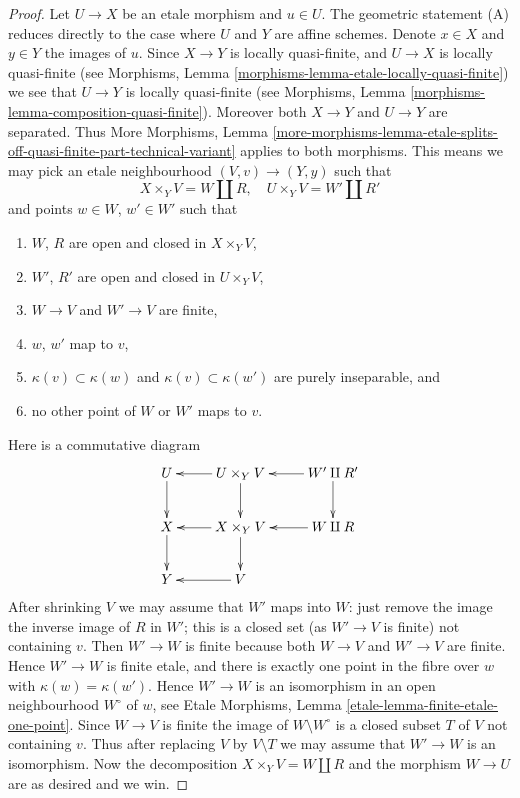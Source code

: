 \begin{proof}
Let $U \to X$ be an etale morphism and $u \in U$.
The geometric statement (A) reduces directly to the case where $U$ and $Y$
are affine schemes. Denote $x \in X$ and $y \in Y$ the
images of $u$. Since $X \to Y$ is locally quasi-finite, and $U \to X$ is
locally quasi-finite (see
Morphisms, Lemma \ref{morphisms-lemma-etale-locally-quasi-finite})
we see that $U \to Y$ is locally quasi-finite (see
Morphisms, Lemma \ref{morphisms-lemma-composition-quasi-finite}).
Moreover both $X \to Y$ and $U \to Y$ are separated. Thus
More Morphisms, Lemma
\ref{more-morphisms-lemma-etale-splits-off-quasi-finite-part-technical-variant}
applies to both morphisms. This means we may pick an etale neighbourhood
$(V, v) \to (Y, y)$ such that
$$
X \times_Y V = W \amalg R, \quad
U \times_Y V = W' \amalg R'
$$
and points $w \in W$, $w' \in W'$ such that
\begin{enumerate}
\item $W$, $R$ are open and closed in $X \times_Y V$,
\item $W'$, $R'$ are open and closed in $U \times_Y V$,
\item $W \to V$ and $W' \to V$ are finite,
\item $w$, $w'$ map to $v$,
\item $\kappa(v) \subset \kappa(w)$ and $\kappa(v) \subset \kappa(w')$
are purely inseparable, and
\item no other point of $W$ or $W'$ maps to $v$.
\end{enumerate}
Here is a commutative diagram
$$
\xymatrix{
U \ar[d] & U \times_Y V \ar[l] \ar[d] & W' \amalg R' \ar[d] \ar[l] \\
X \ar[d] & X \times_Y V \ar[l] \ar[d] & W \amalg R \ar[l] \\
Y & V \ar[l]
}
$$
After shrinking $V$ we may assume that $W'$ maps into $W$:
just remove the image the inverse image of $R$ in $W'$; this is
a closed set (as $W' \to V$ is finite) not containing $v$.
Then $W' \to W$ is finite because both $W \to V$ and $W' \to V$ are finite.
Hence $W' \to W$ is finite etale, and there is exactly one point in the
fibre over $w$ with $\kappa(w) = \kappa(w')$. Hence $W' \to W$ is an
isomorphism in an open neighbourhood $W^\circ$ of $w$, see
Etale Morphisms, Lemma \ref{etale-lemma-finite-etale-one-point}.
Since $W \to V$ is finite the image of $W \setminus W^\circ$ is a closed
subset $T$ of $V$ not containing $v$. Thus after replacing $V$ by
$V \setminus T$ we may assume that $W' \to W$ is an isomorphism.
Now the decomposition $X \times_Y V = W \amalg R$ and the morphism
$W \to U$ are as desired and we win.
\end{proof}

